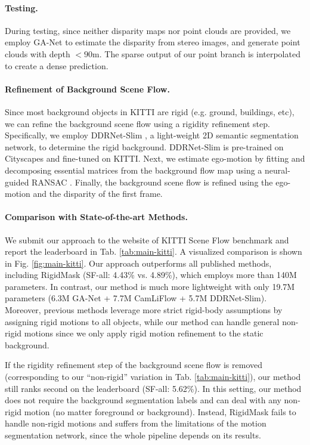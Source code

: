 \documentclass[10pt,twocolumn,letterpaper]{article}
\begin{document}
\vspace{-10pt}
\paragraph{Testing.} During testing, since neither disparity maps nor point clouds are provided, we employ GA-Net \cite{zhang2019ganet} to estimate the disparity from stereo images, and generate point clouds with depth $<90$m. The sparse output of our point branch is interpolated to create a dense prediction.

\vspace{-10pt}
\paragraph{Refinement of Background Scene Flow.} Since most background objects in KITTI are rigid (e.g. ground, buildings, etc), we can refine the background scene flow using a rigidity refinement step. Specifically, we employ DDRNet-Slim \cite{hong2021ddrnet}, a light-weight 2D semantic segmentation network, to determine the rigid background. DDRNet-Slim is pre-trained on Cityscapes \cite{cordts2016cityscapes} and fine-tuned on KITTI. Next, we estimate ego-motion by fitting and decomposing essential matrices from the background flow map using a neural-guided RANSAC \cite{brachmann2019ransac}. Finally, the background scene flow is refined using the ego-motion and the disparity of the first frame.

\vspace{-10pt}
\paragraph{Comparison with State-of-the-art Methods.} We submit our approach to the website of KITTI Scene Flow benchmark and report the leaderboard in Tab. \ref{tab:main-kitti}. A visualized comparison is shown in Fig. \ref{fig:main-kitti}. Our approach outperforms all published methods, including RigidMask \cite{yang2021rigidmask} (SF-all: 4.43\% vs. 4.89\%), which employs more than 140M parameters. In contrast, our method is much more lightweight with only 19.7M parameters (6.3M GA-Net + 7.7M CamLiFlow + 5.7M DDRNet-Slim). Moreover, previous methods leverage more strict rigid-body assumptions by assigning rigid motions to all objects, while our method can handle general non-rigid motions since we only apply rigid motion refinement to the static background.

If the rigidity refinement step of the background scene flow is removed (corresponding to our ``non-rigid'' variation in Tab. \ref{tab:main-kitti}), our method still ranks second on the leaderboard (SF-all: 5.62\%). In this setting, our method does not require the background segmentation labels and can deal with any non-rigid motion (no matter foreground or background). Instead, RigidMask fails to handle non-rigid motions and suffers from the limitations of the motion segmentation network, since the whole pipeline depends on its results.
\end{document}
